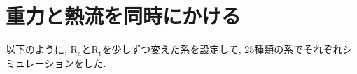 




\section{重力と熱流を同時にかける}

以下のように, $\text{R}_\text{a}$と$\text{R}_\text{t}$を少しずつ変えた系を設定して, 25種類の系でそれぞれシミュレーションをした.

\vspace{1\baselineskip}

